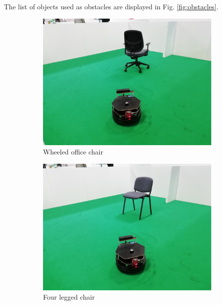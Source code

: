 The list of objects used as obstacles are displayed in Fig. \ref{fig:obstacles}.
\begin{figure}[h!]
  \centering
  \begin{subfigure}[b]{0.3\linewidth}
    \includegraphics[width=\linewidth]{imgs/chapter5/wchair.jpg}
     \caption{Wheeled office chair}
     \label{fig::wchair}
  \end{subfigure}
  \begin{subfigure}[b]{0.3\linewidth}
    \includegraphics[width=\linewidth]{imgs/chapter5/nchair.jpg}
    \caption{Four legged chair}
    \label{fig::nchair}
  \end{subfigure}
  \begin{subfigure}[b]{0.3\linewidth}

\end{subfigure}
\end{figure}
